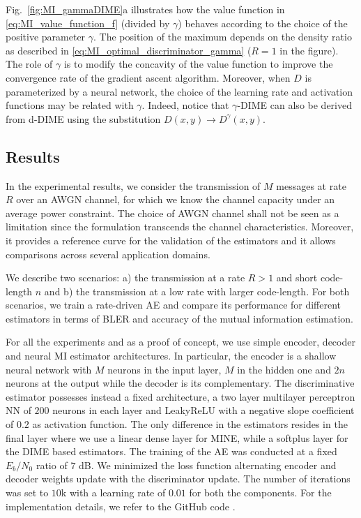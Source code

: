 Fig.~\ref{fig:MI_gammaDIME}a illustrates how the value function in \eqref{eq:MI_value_function_f} (divided by $\gamma$) behaves according to the choice of the positive parameter $\gamma$. The position of the maximum depends on the density ratio as described in \eqref{eq:MI_optimal_discriminator_gamma} ($R = 1$ in the figure). The role of $\gamma$ is to modify the concavity of the value function to improve the convergence rate of the gradient ascent algorithm. Moreover, when $D$ is parameterized by a neural network, the choice of the learning rate and activation functions may be related with $\gamma$. Indeed, notice that $\gamma$-DIME can also be derived from d-DIME using the substitution $D(x,y) \rightarrow D^{\gamma}(x,y)$.

\subsection{Results}
\label{subsec:mi_gammaDIME_results}
In the experimental results, we consider the transmission of $M$ messages at rate $R$ over an AWGN channel, for which we know the channel capacity under an
average power constraint. The choice of AWGN channel shall not be seen as a limitation since the formulation transcends the channel characteristics. Moreover, it provides a reference curve for the validation of the estimators and it allows comparisons across several application domains.

We describe two scenarios: a) the transmission at a rate $R>1$ and short code-length $n$ and b) the transmission at a low rate with larger code-length. For both scenarios, we train a rate-driven AE and compare its performance for different estimators in terms of BLER and accuracy of the mutual information estimation. 

For all the experiments and as a proof of concept, we use simple encoder, decoder and neural MI estimator architectures. In particular, the encoder is a shallow neural network with $M$ neurons in the input layer, $M$ in the hidden one and $2n$ neurons at the output while the decoder is its complementary.  
The discriminative estimator possesses instead a fixed architecture, a
two layer multilayer perceptron NN of $200$
neurons in each layer and LeakyReLU with a negative slope coefficient of $0.2$ as activation function. The only
difference in the estimators resides in the final layer where we use a linear dense layer for MINE, while a softplus layer for the DIME based estimators.
The training of the AE was conducted at a fixed $E_b/N_0$ ratio of $7$ dB. We minimized the loss function alternating encoder and decoder weights update with the discriminator update. The number of iterations was set to $10$k with a learning rate of $0.01$ for both the components. For the implementation details, we refer to the GitHub code \cite{CACAO_github}.

